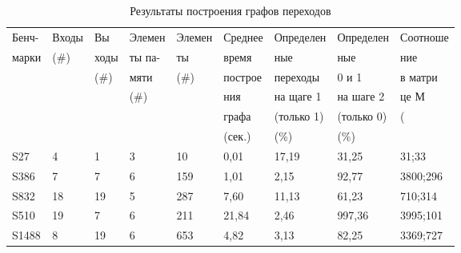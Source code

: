\documentclass[13pt]{article}
\begin{document}
\begin{table}[h!]
    \centering
    \caption{Результаты построения графов переходов}
    \begin{tabular}{|p{1.1cm}|p{1cm}|p{0.9cm}|p{1.2cm}|p{1.2cm}|p{1.3cm}|p{1.7cm}|p{1.7cm}|p{1.6cm}|} 
    \hline
    Бенч-&Входы&Вы&Элемен&Элемен&Среднее&Определен&Определен&Соотноше\\
    марки&(\#)&ходы&ты па-&ты&время&ные&ные&ние\\ 
    &&(\#)&мяти&(\#)&построе&переходы&0 и 1&в матри\\
    &&&(\#)&&ния&на щаге 1&на шаге 2&це М\\
    &&&&&графа&(только 1)&(только 0)&(#0; #1)\\
    &&&&&(сек.)&(\%)&(\%)&\\ \hline
    S27&4&1&3&10&0,01&17,19&31,25&31;33\\ \hline
    S386&7&7&6&159&1,01&2,15&92,77&3800;296\\ \hline
    S832&18&19&5&287&7,60&11,13&61,23&710;314\\ \hline
    S510&19&7&6&211&21,84&2,46&997,36&3995;101\\ \hline
    S1488&8&19&6&653&4,82&3,13&82,25&3369;727\\ \hline
    \end{tabular}
    \label{таблица 1}
\end{table} 
\end{document}
